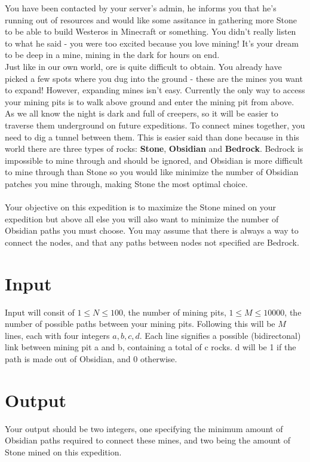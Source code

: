 
\noindent You have been contacted by your server's admin, he informs you that he's running out of resources and would like
some assitance in gathering more Stone to be able to build Westeros in Minecraft or something. You didn't really listen to what
he said - you were too excited because you love mining! It's your dream to be deep in a mine, mining in the dark for hours on end.\\

\noindent Just like in our own world, ore is quite difficult to obtain. You already have picked a few spots where you dug
into the ground - these are the mines you want to expand! However, expanding mines isn't easy. Currently the only way to access
your mining pits is to walk above ground and enter the mining pit from above. As we all know the night is dark and full
of creepers, so it will be easier to traverse them underground on future expeditions. To connect mines together,
you need to dig a tunnel between them. This is easier said than done because in this world there are three types of rocks:
\textbf{Stone}, \textbf{Obsidian} and \textbf{Bedrock}. Bedrock is impossible to mine through and should
be ignored, and Obsidian is more difficult to mine through than Stone so you would like minimize
the number of Obsidian patches you mine through, making Stone the most optimal choice.\\ \\

\noindent Your objective on this expedition is to maximize the Stone mined on your expedition but above all
else you will also want to minimize the number of Obsidian paths you must choose. You may assume that there is always a
way to connect the nodes, and that any paths between nodes not specified are Bedrock.

\section*{Input}
Input will consit of $1 \leq N \leq 100$, the number of mining pits, $1 \leq M \leq 10000$, the number of possible paths
between your mining pits. Following this will be $M$ lines, each with four integers $a,b,c,d$. Each line signifies a
possible (bidirectonal) link between mining pit a and b, containing a total of c rocks. d will be 1 if the path is made out of
Obsidian, and 0 otherwise.

\section*{Output}
Your output should be two integers, one specifying the minimum amount of Obsidian paths required to connect these mines,
and two being the amount of Stone mined on this expedition.
